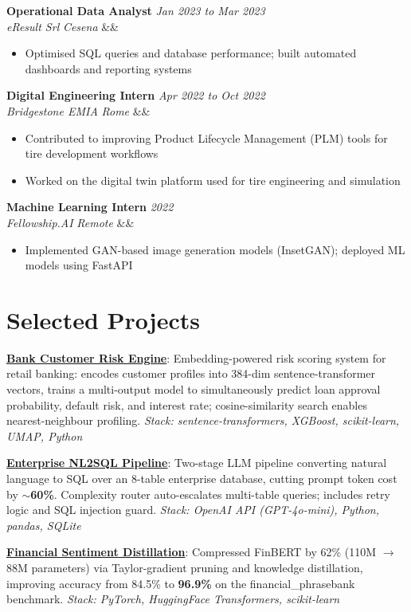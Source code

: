\documentclass[10pt,a4paper]{article}
\newcommand{\cventry}[5]{%
  \noindent\textbf{#1} \hfill \textit{#2}\\
  \textit{#3} \hfill \textit{#4}%
  \ifx&#5&\else\\\textit{#5}\fi
  \vspace{2pt}
}
\begin{document}
\medskip
\cventry{Operational Data Analyst}{Jan 2023 to Mar 2023}{eResult Srl}{Cesena}{}
\begin{itemize}
  \item Optimised SQL queries and database performance; built automated dashboards and reporting systems
\end{itemize}

\medskip
\cventry{Digital Engineering Intern}{Apr 2022 to Oct 2022}{Bridgestone EMIA}{Rome}{}
\begin{itemize}
  \item Contributed to improving Product Lifecycle Management (PLM) tools for tire development workflows
  \item Worked on the digital twin platform used for tire engineering and simulation
\end{itemize}

\medskip
\cventry{Machine Learning Intern}{2022}{Fellowship.AI}{Remote}{}
\begin{itemize}
  \item Implemented GAN-based image generation models (InsetGAN); deployed ML models using FastAPI
\end{itemize}

\section{Selected Projects}

\noindent
\textbf{\href{https://github.com/adebanjiadelowo/llm-portfolio/tree/main/03-bank-customer-risk-engine}{Bank Customer Risk Engine}}:
Embedding-powered risk scoring system for retail banking: encodes customer profiles into 384-dim sentence-transformer vectors, trains a multi-output model to simultaneously predict loan approval probability, default risk, and interest rate; cosine-similarity search enables nearest-neighbour profiling.
\textit{Stack: sentence-transformers, XGBoost, scikit-learn, UMAP, Python}

\textbf{\href{https://github.com/adebanjiadelowo/llm-portfolio/tree/main/02-enterprise-nl2sql}{Enterprise NL2SQL Pipeline}}:
Two-stage LLM pipeline converting natural language to SQL over an 8-table enterprise database, cutting prompt token cost by \textbf{$\sim$60\%}. Complexity router auto-escalates multi-table queries; includes retry logic and SQL injection guard.
\textit{Stack: OpenAI API (GPT-4o-mini), Python, pandas, SQLite}

\textbf{\href{https://github.com/adebanjiadelowo/llm-portfolio/tree/main/01-financial-sentiment-distillation}{Financial Sentiment Distillation}}:
Compressed FinBERT by 62\% (110M $\to$ 88M parameters) via Taylor-gradient pruning and knowledge distillation, improving accuracy from 84.5\% to \textbf{96.9\%} on the financial\_phrasebank benchmark.
\textit{Stack: PyTorch, HuggingFace Transformers, scikit-learn}
\end{document}
